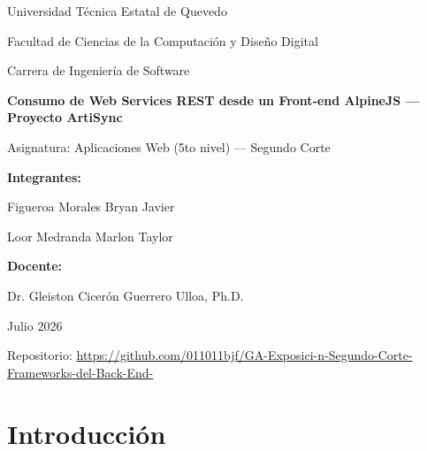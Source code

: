 \documentclass[12pt,a4paper]{article}
\begin{document}
\begin{titlepage}
    \centering

    \vspace*{1cm}
    {\large Universidad Técnica Estatal de Quevedo\par}
    {\large Facultad de Ciencias de la Computación y Diseño Digital\par}
    {\large Carrera de Ingeniería de Software\par}

    \vspace{2.5cm}
    {\Huge\bfseries Consumo de Web Services REST desde un Front-end AlpineJS --- Proyecto ArtiSync\par}

    \vspace{2cm}
    {\large Asignatura: Aplicaciones Web (5to nivel) --- Segundo Corte\par}

    \vspace{1.5cm}
    {\large\bfseries Integrantes:\par}
    {\large Figueroa Morales Bryan Javier\par}
    {\large Loor Medranda Marlon Taylor\par}

    \vspace{1.5cm}
    {\large\bfseries Docente:\par}
    {\large Dr. Gleiston Cicerón Guerrero Ulloa, Ph.D.\par}

    \vspace{1.5cm}
    {\large Julio 2026\par}

    \vspace{1.5cm}
    {\small Repositorio: \url{https://github.com/011011bjf/GA-Exposici-n-Segundo-Corte-Frameworks-del-Back-End-}\par}

    \vfill
\end{titlepage}


\section{Introducción}
\end{document}
